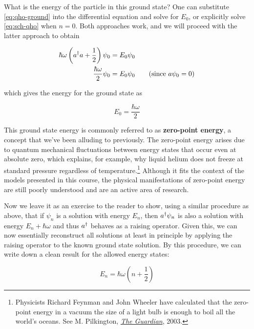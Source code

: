 What is the energy of the particle in this ground state? 
One can substitute \autoref{eq:qho-ground} into the differential equation and solve for $E_0$, or explicitly solve \autoref{eq:sch-qho} when $n = 0$. 
Both approaches work, and we will proceed with the latter approach to obtain

\begin{align*}
	\hbar\omega \left(a^{\dagger} a + \frac{1}{2} \right)\psi_0 &= E_0\psi_0 \\
	\frac{\hbar\omega}{2}\psi_0 &= E_0\psi_0 \tag{since $a\psi_0=0$}
\end{align*}

\noindent which gives the energy for the ground state as

\begin{tcolorbox}[title = Zero-point energy] \vspace{-2ex}
	\begin{equation}
		E_0 = \frac{\hbar\omega}{2} \label{eq:zpe}
	\end{equation}
\end{tcolorbox}

This ground state energy is commonly referred to as \textbf{zero-point energy}, a concept that we've been alluding to previously. 
The zero-point energy arises due to quantum mechanical fluctuations between energy states that occur even at absolute zero, which explains, for example, why liquid helium does not freeze at standard pressure regardless of temperature.\footnote{Physicists Richard Feynman and John Wheeler have calculated that the zero-point energy in a vacuum the size of a light bulb is enough to boil all the world's oceans. See M. Pilkington, \href{https://www.theguardian.com/education/2003/jul/17/research.highereducation}{\emph{The Guardian}}, 2003.} 
Although it fits the context of the models presented in this course, the physical manifestations of zero-point energy are still poorly understood and are an active area of research.

Now we leave it as an exercise to the reader to show, using a similar procedure as above, that if $\psi_n$ is a solution with energy $E_n$, then $a^{\dagger}\psi_n$ is also a solution with energy $E_n + \hbar\omega$ and thus $a^{\dagger}$ behaves as a raising operator. 
Given this, we can now essentially reconstruct all solutions at least in principle by applying the raising operator to the known ground state solution. 
By this procedure, we can write down a clean result for the allowed energy states:

\begin{tcolorbox}[title = Allowed energy states of the QHO] \vspace{-2ex}
	\begin{equation}
		E_n = \hbar\omega\left(n + \frac{1}{2}\right) \label{eq:estates-qho}
	\end{equation}
\end{tcolorbox}

